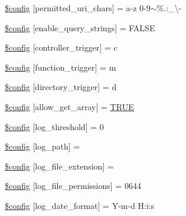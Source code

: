 \begin{DoxyCompactItemize}
\item 
\mbox{\hyperlink{config_8php_a0f3f7fc5dfe7ae9b96622df2858a6c5b}{\$config}} \mbox{[}\textquotesingle{}permitted\+\_\+uri\+\_\+chars\textquotesingle{}\mbox{]} = \textquotesingle{}a-\/z 0-\/9$\sim$\%.\+:\+\_\+\textbackslash{}-\/\textquotesingle{}
\item 
\mbox{\hyperlink{config_8php_ae0af4957b94a8e97908013d8a34b2d58}{\$config}} \mbox{[}\textquotesingle{}enable\+\_\+query\+\_\+strings\textquotesingle{}\mbox{]} = F\+A\+L\+SE
\item 
\mbox{\hyperlink{config_8php_af1ca04d83f60b351122bdcc8933df731}{\$config}} \mbox{[}\textquotesingle{}controller\+\_\+trigger\textquotesingle{}\mbox{]} = \textquotesingle{}c\textquotesingle{}
\item 
\mbox{\hyperlink{config_8php_aed9f24c6600958d9d55acc35c1a2fbfb}{\$config}} \mbox{[}\textquotesingle{}function\+\_\+trigger\textquotesingle{}\mbox{]} = \textquotesingle{}m\textquotesingle{}
\item 
\mbox{\hyperlink{config_8php_aca523de0098516b35bc5fa68ce13962f}{\$config}} \mbox{[}\textquotesingle{}directory\+\_\+trigger\textquotesingle{}\mbox{]} = \textquotesingle{}d\textquotesingle{}
\item 
\mbox{\hyperlink{config_8php_ad899b5e4fb9873f8afcc93e4c788e11c}{\$config}} \mbox{[}\textquotesingle{}allow\+\_\+get\+\_\+array\textquotesingle{}\mbox{]} = \mbox{\hyperlink{constants_8php_ae04a3efe6aa42044f803ee90c2277846}{T\+R\+UE}}
\item 
\mbox{\hyperlink{config_8php_a1a167c2cf5bc9b35df3e8b47957dfe33}{\$config}} \mbox{[}\textquotesingle{}log\+\_\+threshold\textquotesingle{}\mbox{]} = 0
\item 
\mbox{\hyperlink{config_8php_a992a95ce2e2dc83a6a443d4828ea49f8}{\$config}} \mbox{[}\textquotesingle{}log\+\_\+path\textquotesingle{}\mbox{]} = \textquotesingle{}\textquotesingle{}
\item 
\mbox{\hyperlink{config_8php_a5dc1bfe6bafc81ab1f5fc8f5b2b3bc0c}{\$config}} \mbox{[}\textquotesingle{}log\+\_\+file\+\_\+extension\textquotesingle{}\mbox{]} = \textquotesingle{}\textquotesingle{}
\item 
\mbox{\hyperlink{config_8php_a2f0158b0ecb2c39e093957526953346a}{\$config}} \mbox{[}\textquotesingle{}log\+\_\+file\+\_\+permissions\textquotesingle{}\mbox{]} = 0644
\item 
\mbox{\hyperlink{config_8php_ae9f524e834e4d05f0e30aed5edb33e2c}{\$config}} \mbox{[}\textquotesingle{}log\+\_\+date\+\_\+format\textquotesingle{}\mbox{]} = \textquotesingle{}Y-\/m-\/d H\+:i\+:s\textquotesingle{}

\end{DoxyCompactItemize}
